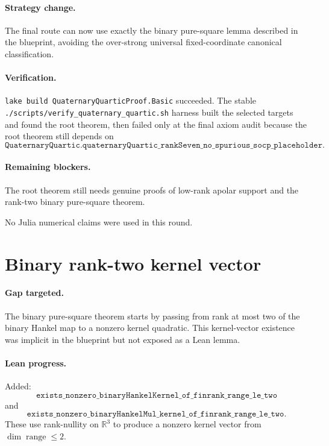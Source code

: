 \documentclass[11pt]{article}
\begin{document}
\paragraph{Strategy change.}
The final route can now use exactly the binary pure-square lemma described in
the blueprint, avoiding the over-strong universal fixed-coordinate canonical
classification.

\paragraph{Verification.}
\texttt{lake build QuaternaryQuarticProof.Basic} succeeded.  The stable
\texttt{./scripts/verify\_quaternary\_quartic.sh} harness built the selected
targets and found the root theorem, then failed only at the final axiom audit
because the root theorem still depends on
\[
\texttt{QuaternaryQuartic.quaternaryQuartic\_rankSeven\_no\_spurious\_socp\_placeholder}.
\]

\paragraph{Remaining blockers.}
The root theorem still needs genuine proofs of low-rank apolar support and the
rank-two binary pure-square theorem.

No Julia numerical claims were used in this round.

\section*{Binary rank-two kernel vector}

\paragraph{Gap targeted.}
The binary pure-square theorem starts by passing from rank at most two of the
binary Hankel map to a nonzero kernel quadratic.  This kernel-vector existence
was implicit in the blueprint but not exposed as a Lean lemma.

\paragraph{Lean progress.}
Added:
\[
\texttt{exists\_nonzero\_binaryHankelKernel\_of\_finrank\_range\_le\_two}
\]
and
\[
\texttt{exists\_nonzero\_binaryHankelMul\_kernel\_of\_finrank\_range\_le\_two}.
\]
These use rank-nullity on \(\mathbb{R}^3\) to produce a nonzero kernel vector
from \(\dim \operatorname{range}\le 2\).
\end{document}
